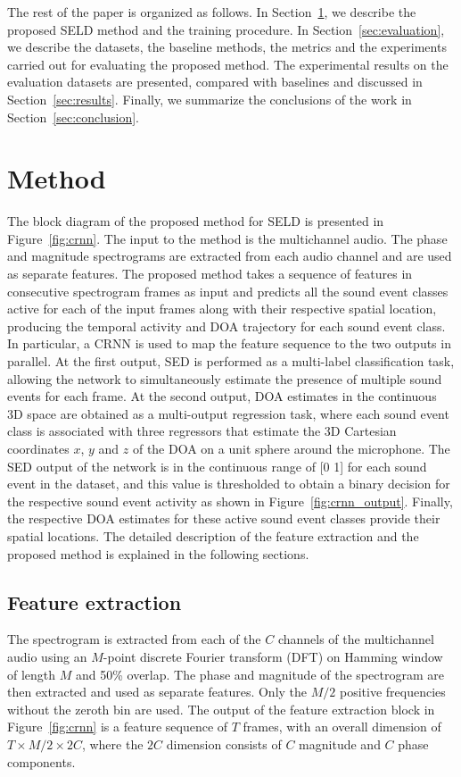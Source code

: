 \documentclass[journal]{IEEEtran}
\begin{document}
The rest of the paper is organized as follows. In Section~\ref{sec:method}, we describe the proposed SELD method and the training procedure. In Section~\ref{sec:evaluation}, we describe the datasets, the baseline methods, the metrics and the experiments carried out for evaluating the proposed method. The experimental results on the evaluation datasets are presented, compared with baselines and discussed in Section~\ref{sec:results}. Finally, we summarize the conclusions of the work in Section~\ref{sec:conclusion}.



\section{Method} 
\label{sec:method}
The block diagram of the proposed method for SELD is presented in Figure~\ref{fig:crnn}. The input to the method is the multichannel audio. The phase and magnitude spectrograms are extracted from each audio channel and are used as separate features. The proposed method takes a sequence of features in consecutive spectrogram frames as input and predicts all the sound event classes active for each of the input frames along with their respective spatial location, producing the temporal activity and DOA trajectory for each sound event class. In particular, a CRNN is used to map the feature sequence to the two outputs in parallel. At the first output, SED is performed as a multi-label classification task, allowing the network to simultaneously estimate the presence of multiple sound events for each frame. At the second output, DOA estimates in the continuous 3D space are obtained as a multi-output regression task, where each sound event class is associated with three regressors that estimate the 3D Cartesian coordinates $x$, $y$ and $z$ of the DOA on a unit sphere around the microphone. The SED output of the network is in the continuous range of [0 1] for each sound event in the dataset, and this value is thresholded to obtain a binary decision for the respective sound event activity as shown in Figure~\ref{fig:crnn_output}. Finally, the respective DOA estimates for these active sound event classes provide their spatial locations. The detailed description of the feature extraction and the proposed method is explained in the following sections.

\subsection{Feature extraction}
The spectrogram is extracted from each of the $C$ channels of the multichannel audio using an $M$-point discrete Fourier transform (DFT) on Hamming window of length $M$ and 50\% overlap. The phase and magnitude of the spectrogram are then extracted and used as separate features. Only the $M/2$ positive frequencies without the zeroth bin are used. The output of the feature extraction block in Figure~\ref{fig:crnn} is a feature sequence of $T$ frames, with an overall dimension of $T\times M/2 \times 2C$, where the $2C$ dimension consists of $C$ magnitude and $C$ phase components.
\end{document}
